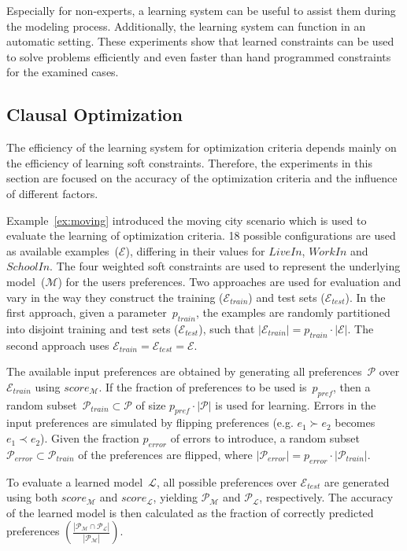 \documentclass[letterpaper]{article}
\newcommand{\sym}[1]{\ensuremath{\mathcal{#1}}}
\theoremstyle{definition}
\newcommand{\abs}[1]{\left|#1\right|}
\begin{document}
Especially for non-experts, a learning system can be useful to assist them during the modeling process.
Additionally, the learning system can function in an automatic setting.
These experiments show that learned constraints can be used to solve problems efficiently and even faster than hand programmed constraints for the examined cases.

\subsection{Clausal Optimization}
The efficiency of the learning system for optimization criteria depends mainly on the efficiency of learning soft constraints.
Therefore, the experiments in this section are focused on the accuracy of the optimization criteria and the influence of different factors.

Example~\ref{ex:moving} introduced the moving city scenario which is used to evaluate the learning of optimization criteria.
18 possible configurations are used as available examples~(\sym{E}), differing in their values for $\mathit{LiveIn}$, $\mathit{WorkIn}$ and $\mathit{SchoolIn}$.
The four weighted soft constraints are used to represent the underlying model~(\sym{M}) for the users preferences.
Two approaches are used for evaluation and vary in the way they construct the training ($\sym{E}_{train}$) and test sets ($\sym{E}_{test}$).
In the first approach, given a parameter~$p_{train}$, the examples are randomly partitioned into disjoint training and test sets ($\sym{E}_{test}$), such that $\abs{\sym{E}_{train}} = p_{train} \cdot \abs{\sym{E}}$.
The second approach uses $\sym{E}_{train} = \sym{E}_{test} = \sym{E}$.

The available input preferences are obtained by generating all preferences~$\sym{P}$ over $\sym{E}_{train}$ using $score_{\sym{M}}$.
If the fraction of preferences to be used is~$p_{pref}$, then a random subset~$\sym{P}_{train} \subset \sym{P}$ of size $p_{pref} \cdot \abs{\sym{P}}$ is used for learning.
Errors in the input preferences are simulated by flipping preferences (e.g. $e_1 \succ e_2$ becomes $e_1 \prec e_2$).
Given the fraction $p_{error}$ of errors to introduce, a random subset $\sym{P}_{error} \subset \sym{P}_{train}$ of the preferences are flipped, where $\abs{\sym{P}_{error}} = p_{error} \cdot \abs{\sym{P}_{train}}$.

To evaluate a learned model~$\sym{L}$, all possible preferences over $\sym{E}_{test}$ are generated using both $score_{\sym{M}}$ and $score_{\sym{L}}$, yielding $\sym{P}_\sym{M}$ and $\sym{P}_\sym{L}$, respectively.
The accuracy of the learned model is then calculated as the fraction of correctly predicted preferences $(\frac{\abs{\sym{P}_\sym{M} \cap \sym{P}_\sym{L}}}{\abs{\sym{P}_\sym{M}}})$.
\end{document}
